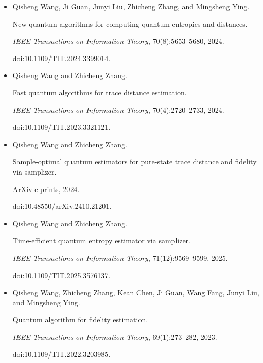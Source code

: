 \documentclass[10pt,a4paper]{article}
\begin{document}
\begin{itemize}
doi:10.1109/TIT.2024.3447915.





\item[] 
[40]

Qisheng Wang, Ji Guan, Junyi Liu, Zhicheng Zhang, and Mingsheng Ying.


New quantum algorithms for computing quantum entropies and distances.


\emph{IEEE Transactions on Information Theory}, 70(8):5653–5680,
2024.


doi:10.1109/TIT.2024.3399014.





\item[] 
[41]

Qisheng Wang and Zhicheng Zhang.


Fast quantum algorithms for trace distance estimation.


\emph{IEEE Transactions on Information Theory}, 70(4):2720–2733,
2024.


doi:10.1109/TIT.2023.3321121.





\item[] 
[42]

Qisheng Wang and Zhicheng Zhang.


Sample-optimal quantum estimators for pure-state trace distance and
fidelity via samplizer.


ArXiv e-prints, 2024.


doi:10.48550/arXiv.2410.21201.





\item[] 
[43]

Qisheng Wang and Zhicheng Zhang.


Time-efficient quantum entropy estimator via samplizer.


\emph{IEEE Transactions on Information Theory}, 71(12):9569–9599,
2025.


doi:10.1109/TIT.2025.3576137.





\item[] 
[44]

Qisheng Wang, Zhicheng Zhang, Kean Chen, Ji Guan, Wang Fang, Junyi Liu, and
Mingsheng Ying.


Quantum algorithm for fidelity estimation.


\emph{IEEE Transactions on Information Theory}, 69(1):273–282, 2023.


doi:10.1109/TIT.2022.3203985.





\end{itemize}
\end{document}
